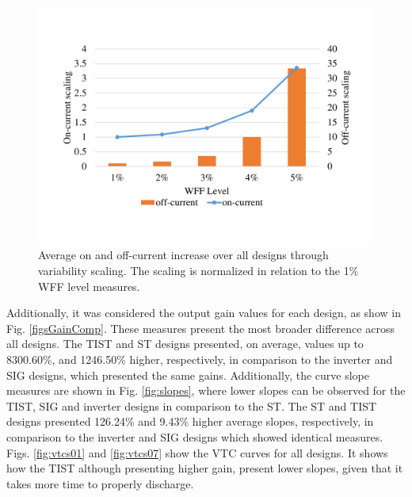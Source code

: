 \documentclass[pgmicro,mestrado,english]{iiufrgs}
\begin{document}
    \begin{figure}[]
        \centering
            \includegraphics[width=1\textwidth, trim={1.25cm 3cm 2cm 3cm}, clip]{on-off-scaling2.pdf}
            \caption{Average on and off-current increase over all designs through variability scaling. The scaling is normalized in relation to the 1\% WFF level measures.}
        \label{figOnOffScal}
    \end{figure}
    
    Additionally, it was considered the output gain values for each design, as show in Fig. \ref{figsGainComp}. These measures present the most broader difference across all designs. The TIST and ST designs presented, on average, values up to 8300.60\%, and 1246.50\% higher, respectively, in comparison to the inverter and SIG designs, which presented the same gains. Additionally, the curve slope measures are shown in Fig. \ref{fig:slopes}, where lower slopes can be observed for the TIST, SIG and inverter designs in comparison to the ST. The ST and TIST designs presented 126.24\% and 9.43\% higher average slopes, respectively, in comparison to the inverter and SIG designs which showed identical measures. Figs. \ref{fig:vtcs01} and \ref{fig:vtcs07} show the VTC curves for all designs. It shows how the TIST although presenting higher gain, present lower slopes, given that it takes more time to properly discharge.
    
\end{document}
